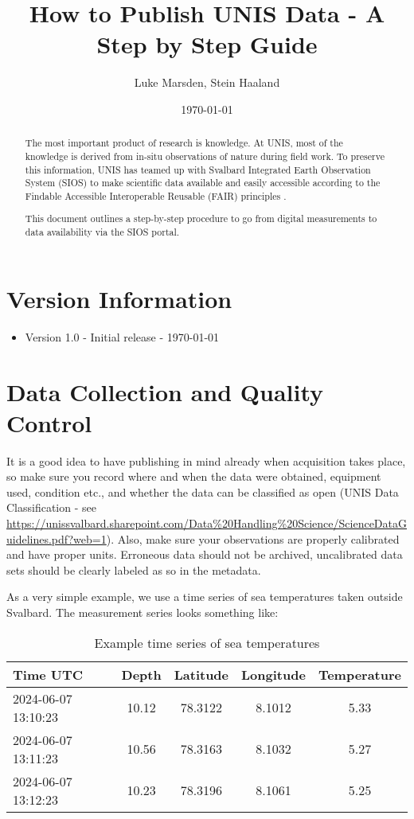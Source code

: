 \documentclass[a4paper,12pt]{article}
\title{How to Publish UNIS Data - A Step by Step Guide}
\author{
    Luke Marsden, Stein Haaland \\
    \emailauthors
}
\date{\today}
\begin{document}
\maketitle

\begin{abstract}
The most important product of research is knowledge. At UNIS, most of the knowledge is derived from in-situ observations of nature during field work. To preserve this information, UNIS has teamed up with Svalbard Integrated Earth Observation System (SIOS) to make scientific data available and easily accessible according to the Findable Accessible Interoperable Reusable (FAIR) principles \citep{wilkinson2016fair}.

This document outlines a step-by-step procedure to go from digital measurements to data availability via the SIOS portal.
\end{abstract}

\tableofcontents

\section*{Version Information}
\label{sec:version-info}
\begin{itemize}
    \item Version 1.0 - Initial release - \today
\end{itemize}

\newpage

\section{Data Collection and Quality Control}
\label{sec:data-collection-quality-control}

It is a good idea to have publishing in mind already when acquisition takes place, so make sure you record where and when the data were obtained, equipment used, condition etc., and whether the data can be classified as open (UNIS Data Classification - see \url{https://unissvalbard.sharepoint.com/Data%20Handling%20Science/ScienceDataGuidelines.pdf?web=1}). Also, make sure your observations are properly calibrated and have proper units. Erroneous data should not be archived, uncalibrated data sets should be clearly labeled as so in the metadata. 

As a very simple example, we use a time series of sea temperatures taken outside Svalbard. The measurement series looks something like:

\begin{table}[h!]
\centering
\caption{Example time series of sea temperatures}
\label{table:sea-temperatures}
\begin{tabular}{lcccc}
\hline
\textbf{Time UTC} & \textbf{Depth} & \textbf{Latitude} & \textbf{Longitude} & \textbf{Temperature} \\
\hline
2024-06-07 13:10:23 & 10.12 & 78.3122 & 8.1012 & 5.33 \\
2024-06-07 13:11:23 & 10.56 & 78.3163 & 8.1032 & 5.27 \\
2024-06-07 13:12:23 & 10.23 & 78.3196 & 8.1061 & 5.25 \\
\hline
\end{tabular}
\end{table}
\end{document}
